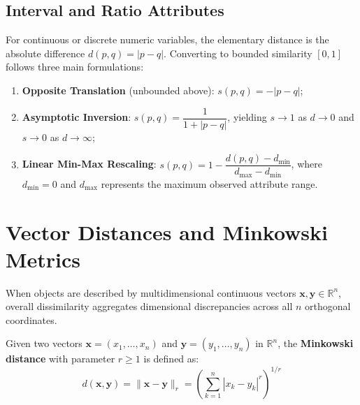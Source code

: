 \subsection{Interval and Ratio Attributes}
For continuous or discrete numeric variables, the elementary distance is the absolute difference $d(p, q) = |p - q|$. Converting to bounded similarity $[0, 1]$ follows three main formulations:
\begin{enumerate}
    \item \textbf{Opposite Translation} (unbounded above): $s(p, q) = -|p - q|$;
    \item \textbf{Asymptotic Inversion}: $s(p, q) = \dfrac{1}{1 + |p - q|}$, yielding $s \to 1$ as $d \to 0$ and $s \to 0$ as $d \to \infty$;
    \item \textbf{Linear Min-Max Rescaling}: $s(p, q) = 1 - \dfrac{d(p, q) - d_{\min}}{d_{\max} - d_{\min}}$, where $d_{\min} = 0$ and $d_{\max}$ represents the maximum observed attribute range.
\end{enumerate}

\section{Vector Distances and Minkowski Metrics}
\label{sec:dm-vector-minkowski-distances}

When objects are described by multidimensional continuous vectors $\mathbf{x}, \mathbf{y} \in \mathbb{R}^n$, overall dissimilarity aggregates dimensional discrepancies across all $n$ orthogonal coordinates.

\begin{definition}
Given two vectors $\mathbf{x} = (x_1, \dots, x_n)$ and $\mathbf{y} = (y_1, \dots, y_n)$ in $\mathbb{R}^n$, the \textbf{Minkowski distance} with parameter $r \ge 1$ is defined as:
\begin{equation}
    d(\mathbf{x}, \mathbf{y}) = \|\mathbf{x} - \mathbf{y}\|_r = \left( \sum_{k=1}^n |x_k - y_k|^r \right)^{1/r}
    \label{eq:dm-minkowski}
\end{equation}
\end{definition}

